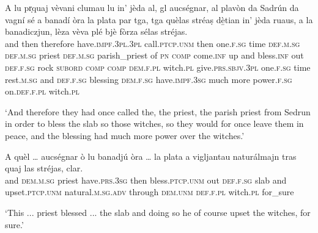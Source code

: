 \begin{linenumbers}
	\gll A lu pr̩quaj vèvani clumau lu in’ jèda al, gl aucségnar, al plavòn da Sadrún da vagní sé a banadí òra la plata par tga, tga quèlas stréaṣ dè̱tian\footnotemark{} in’ jèda ruaus, a la banadiczjun, lèza vèva plé bjè fòrza sélas stréjas.\\
and then therefore have.\textsc{impf.3pl.3pl} call.\textsc{ptcp.unm} then one.\textsc{f.sg} time \textsc{def.m.sg} \textsc{def.m.sg} priest \textsc{def.m.sg} parish\_priest of \textsc{pn} \textsc{comp} come.\textsc{inf} up and bless.\textsc{inf} out \textsc{def.f.sg} rock \textsc{subord} \textsc{comp} \textsc{comp} \textsc{dem.f.pl} witch.\textsc{pl} give.\textsc{prs.sbjv.3pl} one.\textsc{f.sg} time rest.\textsc{m.sg} and \textsc{def.f.sg} blessing \textsc{dem.f.sg} have.\textsc{impf.3sg} much more power.\textsc{f.sg} on.\textsc{def.f.pl} witch.\textsc{pl}\\
\end{linenumbers}
\medskip
\glt `And therefore they had once called the, the priest, the parish priest from Sedrun in order to bless the slab so those witches, so they would for once leave them in peace, and the blessing had much more power over the witches.'
\medskip

\begin{linenumbers}
	\gll 
A quèl … aucségnar ò lu banadjú òra … la plata a vigljantau naturálmajn tras quaj las stréjas, clar.\\
and \textsc{dem.m.sg} {} priest have.\textsc{prs.3sg} then bless.\textsc{ptcp.unm} out {} \textsc{def.f.sg} slab and upset.\textsc{ptcp.unm} natural.\textsc{m.sg.adv} through \textsc{dem.unm} \textsc{def.f.pl} witch.\textsc{pl} for\_sure\\
\end{linenumbers}
\medskip
\glt `This ... priest blessed ... the slab and doing so he of course upset the witches, for sure.'
\medskip

